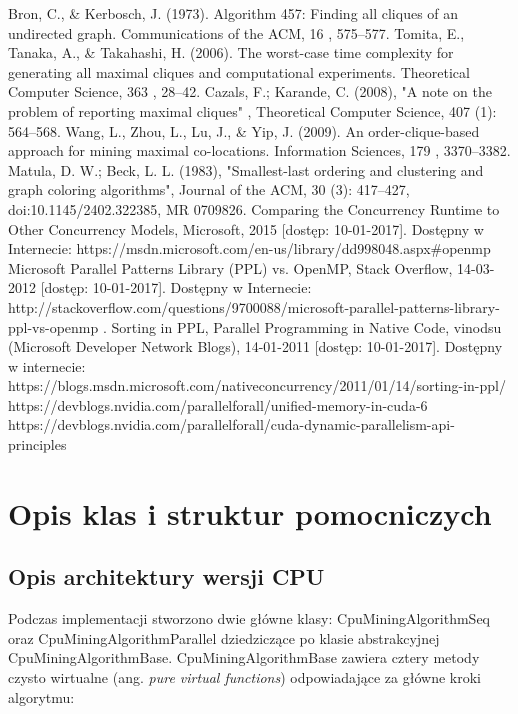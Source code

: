 \documentclass[12pt]{article}
\begin{document}
\begin{thebibliography}{}
Bron, C., \& Kerbosch, J. (1973). Algorithm 457: Finding all cliques of an undirected graph. Communications of the ACM, 16 , 575–577.
Tomita, E., Tanaka, A., \& Takahashi, H. (2006). The worst-case time complexity for
generating all maximal cliques and computational experiments. Theoretical Computer Science, 363 , 28–42.
Cazals, F.; Karande, C. (2008), "A note on the problem of reporting maximal cliques" , Theoretical Computer Science, 407 (1): 564–568.
Wang, L., Zhou, L., Lu, J., \& Yip, J. (2009). An order-clique-based approach for mining maximal co-locations. Information Sciences, 179 , 3370–3382.
Matula, D. W.; Beck, L. L. (1983), "Smallest-last ordering and clustering and graph coloring algorithms", Journal of the ACM, 30 (3): 417–427, doi:10.1145/2402.322385, MR 0709826.
Comparing the Concurrency Runtime to Other Concurrency Models, Microsoft, 2015 [dostęp: 10-01-2017]. Dostępny w Internecie: https://msdn.microsoft.com/en-us/library/dd998048.aspx\#openmp
Microsoft Parallel Patterns Library (PPL) vs. OpenMP, Stack Overflow, 14-03-2012 [dostęp: 10-01-2017]. Dostępny w Internecie: http://stackoverflow.com/questions/9700088/microsoft-parallel-patterns-library-ppl-vs-openmp
. Sorting in PPL, Parallel Programming in Native Code, vinodsu (Microsoft Developer Network Blogs), 14-01-2011 [dostęp: 10-01-2017]. Dostępny w internecie: https://blogs.msdn.microsoft.com/nativeconcurrency/2011/01/14/sorting-in-ppl/
https://devblogs.nvidia.com/parallelforall/unified-memory-in-cuda-6
https://devblogs.nvidia.com/parallelforall/cuda-dynamic-parallelism-api-principles
\end{thebibliography}

\newpage

\appendix

\section{Opis klas i struktur pomocniczych}
\label{sec:wypociny}

\subsection{Opis architektury wersji CPU}

Podczas implementacji stworzono dwie główne klasy: CpuMiningAlgorithmSeq oraz CpuMiningAlgorithmParallel dziedziczące po klasie abstrakcyjnej CpuMiningAlgorithmBase. CpuMiningAlgorithmBase zawiera cztery metody czysto wirtualne (ang. \textit{pure virtual functions}) odpowiadające za główne kroki algorytmu:
\end{document}
